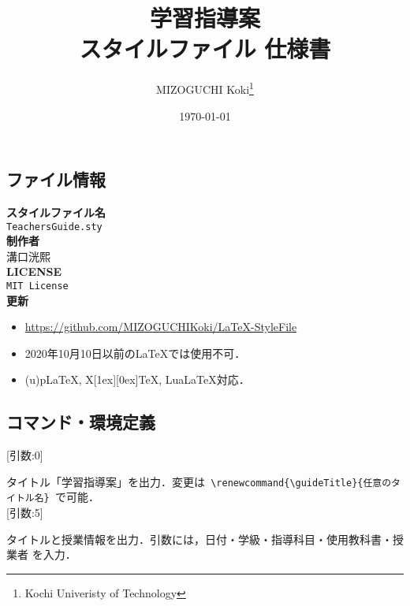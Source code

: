 \documentclass[paper=a4,fontsize=10.5pt]{jlreq}
\title{\vspace{-2em}\textbf{学習指導案}\\ \LaTeXe スタイルファイル 仕様書}
\author{MIZOGUCHI Koki\thanks{Kochi Univeristy of Technology}}
\date{\today}
\begin{document}
\maketitle
\begin{leftbar}
    \section*{ファイル情報}
\end{leftbar}
\begin{multicols}{2}
    \noindent\textbf{スタイルファイル名}\\
    \hspace{0.5em}\verb|TeachersGuide.sty|\\
    \textbf{制作者}\\
    \hspace{0.5em}溝口洸熙\\
    \textbf{LICENSE}\\
    \hspace{0.5em}\verb|MIT License|\\
    \newline
    \textbf{更新}
    \begin{itemize}
        \item {\scriptsize\href{https://github.com/MIZOGUCHIKoki/LaTeX-StyleFile}{https://github.com/MIZOGUCHIKoki/LaTeX-StyleFile}}\\
        \item 2020年10月10日以前の\LaTeX では使用不可．\\
        \item (u)p\LaTeX, X\hspace{-0.15em}\raisebox{-0.5ex}[1ex][0ex]{}\hspace{-0.15em}\TeX, Lua\LaTeX 対応．
    \end{itemize}
\end{multicols}
\begin{leftbar}
    \section*{コマンド・環境定義}
\end{leftbar}
\noindent\ovalbox{\verb|\guideTitle|} [引数:0]\par
タイトル「学習指導案」を出力．変更は\verb| \renewcommand{\guideTitle}{任意のタイトル名} |で可能．\\
\ovalbox{\verb|\showTitle|} [引数:5]\par
タイトルと授業情報を出力．引数には，日付・学級・指導科目・使用教科書・授業者 を入力．\\
\end{document}
